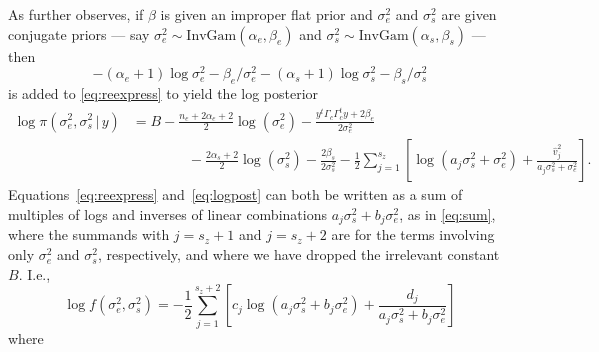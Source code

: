 \documentclass[ejs]{imsart}
\newcommand{\IG}{\text{InvGam}}
\newcommand{\RL}{f}
\newcommand{\logRL}{\log\RL}
\newcommand{\sigssq}{\sigma_s^2}
\newcommand{\sigesq}{\sigma_e^2}
\newcommand{\logRLss}{\logRL(\sigesq,\sigssq)}
\newcommand{\ass}{a_j\sigssq + \sigesq}
\newcommand{\abss}{a_j\sigssq + b_j\sigesq}
\newcommand{\g}{\,|\,}
\begin{document}
As \cite{hodges:2013} further observes, if $\beta$ is given an improper flat prior and $\sigesq$ and $\sigssq$ are given conjugate priors --- say $\sigesq \sim \IG(\alpha_e,\beta_e)$ and $\sigssq \sim \IG(\alpha_s,\beta_s)$ --- then \begin{equation*}
  -(\alpha_e+1) \log\sigesq - \beta_e/\sigesq -(\alpha_s+1) \log\sigssq - \beta_s/\sigssq
\end{equation*}
is added to \eqref{eq:reexpress} to yield
the log posterior
\begin{equation}
\label{eq:logpost}
  \begin{split}
  \log\pi(\sigesq,\sigssq\g y) &=
  B - \frac{n_e + 2\alpha_e + 2}{2}\log(\sigesq) -
    \frac{y^t \Gamma_c \Gamma^t_c y + 2\beta_e}{2\sigesq}\\
    &\qquad\qquad - \frac{2\alpha_s + 2} {2}\log(\sigssq) - \frac{2\beta_s}{2\sigssq}
    - \frac{1}{2} \sum_{j=1}^{s_z} \left[ \log(\ass) + \frac{\hat v_j^2}{\ass}\right].
  \end{split}
\end{equation}
Equations~\eqref{eq:reexpress} and~\eqref{eq:logpost} can both be written as a sum of multiples of logs and inverses of linear combinations $\abss$, as in \eqref{eq:sum}, where the summands with $j=s_z+1$ and $j=s_z+2$ are for the terms involving only $\sigesq$ and $\sigssq$, respectively, and where we have dropped the irrelevant constant $B$.  I.e.,
\begin{equation}
\label{eq:sum}
  \logRLss = -\frac{1}{2} \sum_{j=1}^{s_z+2}\left[ c_j \log(\abss) + \frac{d_j}{\abss}\right]
\end{equation}
where
\end{document}
